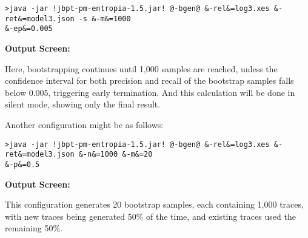 \begin{lstlisting}[style=CL]
>java -jar !jbpt-pm-entropia-1.5.jar! @-bgen@ &-rel&=log3.xes &-ret&=model3.json -s &-m&=1000
&-ep&=0.005
\end{lstlisting}

\textbf{Output Screen:}%


Here, bootstrapping continues until 1,000 samples
are reached, unless the confidence interval for both
precision and recall of the bootstrap samples falls
below 0.005, triggering early termination.
And this calculation will  be done in silent mode,
showing only the final result.


Another configuration might be as follows:

\begin{lstlisting}[style=CL]
>java -jar !jbpt-pm-entropia-1.5.jar! @-bgen@ &-rel&=log3.xes &-ret&=model3.json &-n&=1000 &-m&=20
&-p&=0.5
\end{lstlisting}

\textbf{Output Screen:}%


This configuration generates 20 bootstrap samples, each
containing 1,000 traces, with new traces being generated
50\% of the time, and existing traces used the remaining 50\%.








